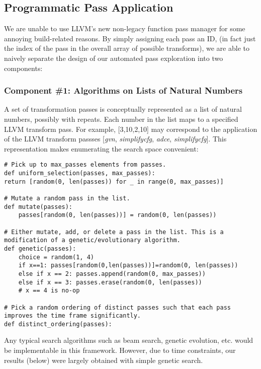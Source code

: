 \documentclass{vldb}
\begin{document}
\subsection{Programmatic Pass Application}

We are unable to use LLVM's new non-legacy function pass manager for some annoying build-related reasons. By simply assigning each pass an ID, (in fact just the index of the pass in the overall array of possible transforms), we are able to naively separate the design of our automated pass exploration into two components:

\subsubsection{Component \#1: Algorithms on Lists of Natural Numbers}

A set of transformation passes is conceptually represented as a list of natural numbers, possibly with repeats. Each number in the list maps to a specified LLVM transform pass. For example, [3,10,2,10] may correspond to the application of the LLVM transform passses [\textit{gvn}, \textit{simplifycfg}, \textit{adce}, \textit{simplifycfg}]. This representation makes enumerating the search space convenient:

\begin{lstlisting}
# Pick up to max_passes elements from passes.
def uniform_selection(passes, max_passes):
return [random(0, len(passes)) for _ in range(0, max_passes)]

# Mutate a random pass in the list.
def mutate(passes):
    passes[random(0, len(passes))] = random(0, len(passes))

# Either mutate, add, or delete a pass in the list. This is a modification of a genetic/evolutionary algorithm.
def genetic(passes):
    choice = random(1, 4)
    if x==1: passes[random(0,len(passes))]=random(0, len(passes))
    else if x == 2: passes.append(random(0, max_passes))
    else if x == 3: passes.erase(random(0, len(passes))
    # x == 4 is no-op
    
# Pick a random ordering of distinct passes such that each pass improves the time frame significantly.
def distinct_ordering(passes):
\end{lstlisting}

Any typical search algorithms such as beam search, genetic evolution, etc. would be implementable in this framework. However, due to time constraints, our results (below) were largely obtained with simple genetic search.
\end{document}
